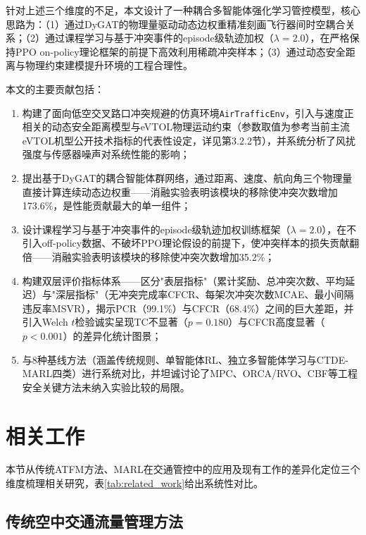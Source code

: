 \documentclass[12pt,a4paper,UTF8]{ctexart}
\begin{document}
针对上述三个维度的不足，本文设计了一种耦合多智能体强化学习管控模型，核心思路为：（1）通过DyGAT的物理量驱动动态边权重精准刻画飞行器间时空耦合关系；（2）通过课程学习与基于冲突事件的episode级轨迹加权（$\lambda=2.0$），在严格保持PPO on-policy理论框架的前提下高效利用稀疏冲突样本；（3）通过动态安全距离与物理约束建模提升环境的工程合理性。

本文的主要贡献包括：

\begin{enumerate}[label=(\arabic*)]
    \item 构建了面向低空交叉路口冲突规避的仿真环境\texttt{AirTrafficEnv}，引入与速度正相关的动态安全距离模型与eVTOL物理运动约束（参数取值为参考当前主流eVTOL机型公开技术指标的代表性设定，详见第3.2.2节），并系统分析了风扰强度与传感器噪声对系统性能的影响；
    \item 提出基于DyGAT的耦合智能体群网络，通过距离、速度、航向角三个物理量直接计算连续动态边权重——消融实验表明该模块的移除使冲突次数增加173.6\%，是性能贡献最大的单一组件；
    \item 设计课程学习与基于冲突事件的episode级轨迹加权训练框架（$\lambda=2.0$），在不引入off-policy数据、不破坏PPO理论假设的前提下，使冲突样本的损失贡献翻倍——消融实验表明该模块的移除使冲突次数增加35.2\%；
    \item 构建双层评价指标体系——区分"表层指标"（累计奖励、总冲突次数、平均延迟）与"深层指标"（无冲突完成率CFCR、每架次冲突次数MCAE、最小间隔违反率MSVR），揭示PCR（99.1\%）与CFCR（68.4\%）之间的巨大差距，并引入Welch $t$检验诚实呈现TC不显著（$p=0.180$）与CFCR高度显著（$p<0.001$）的差异化统计图景；
    \item 与8种基线方法（涵盖传统规则、单智能体RL、独立多智能体学习与CTDE-MARL四类）进行系统对比，并坦诚讨论了MPC、ORCA/RVO、CBF等工程安全关键方法未纳入实验比较的局限。
\end{enumerate}

\section{相关工作}

本节从传统ATFM方法、MARL在交通管控中的应用及现有工作的差异化定位三个维度梳理相关研究，表\ref{tab:related_work}给出系统性对比。

\subsection{传统空中交通流量管理方法}
\end{document}
